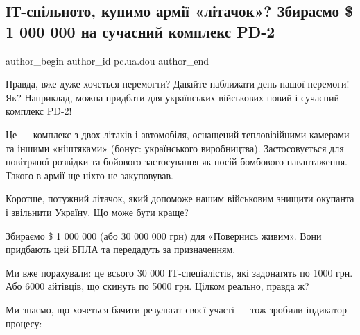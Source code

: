  
 
 
 
 
 
\subsection{ІТ-спільното, купимо армії «літачок»? Збираємо \$ 1 000 000 на сучасний комплекс PD-2}
\label{sec:06_05_2022.stz.pc.ua.dou.1.litachok}
 
\ifcmt
 author_begin
   author_id pc.ua.dou
 author_end
\fi

Правда, вже дуже хочеться перемогти? Давайте наближати день нашої перемоги! Як?
Наприклад, можна придбати для українських військових новий і сучасний комплекс
PD-2!

Це — комплекс з двох літаків і автомобіля, оснащений тепловізійними камерами та
іншими «ніштяками» (бонус: українського виробництва). Застосовується для
повітряної розвідки та бойового застосування як носій бомбового навантаження.
Такого в армії ще ніхто не закуповував.

Коротше, потужний літачок, який допоможе нашим військовим знищити окупанта і
звільнити Україну. Що може бути краще?

Збираємо \$ 1 000 000 (або 30 000 000 грн) для «Повернись живим». Вони
придбають цей БПЛА та передадуть за призначенням.

Ми вже порахували: це всього 30 000 IT-спеціалістів, які задонатять по 1000
грн. Або 6000 айтівців, що скинуть по 5000 грн. Цілком реально, правда ж?

Ми знаємо, що хочеться бачити результат своєї участі — тож зробили індикатор
процесу:

